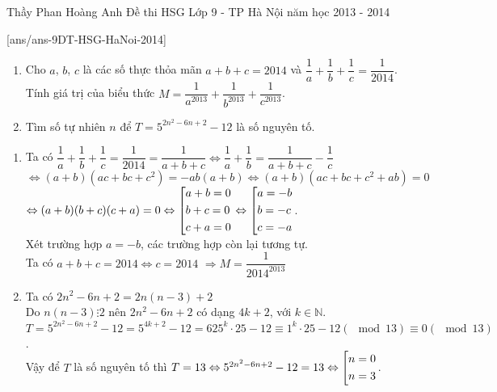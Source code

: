 \begin{name}
{Thầy  Phan Hoàng Anh}
{Đề thi HSG Lớp 9 -  TP Hà Nội năm học 2013 - 2014}
\end{name}
\setcounter{ex}{0}
[ans/ans-9DT-HSG-HaNoi-2014]
\begin{ex}%
    \hfill
    \begin{enumerate}
        \item Cho $a$, $b$, $c$ là các số thực thỏa mãn $a+b+c=2014$ và $\dfrac{1}{a}+\dfrac{1}{b}+\dfrac{1}{c}=\dfrac{1}{2014}$. Tính giá trị của biểu thức $M=\dfrac{1}{a^{2013}}+\dfrac{1}{b^{2013}}+\dfrac{1}{c^{2013}}$.
        \item Tìm số tự nhiên $n$ để $T=5^{2n^2-6n+2}-12$ là số nguyên tố.
    \end{enumerate}
\loigiai
    {\begin{enumerate}
        \item Ta có $\dfrac{1}{a}+\dfrac{1}{b}+\dfrac{1}{c}=\dfrac{1}{2014}=\dfrac{1}{a+b+c}\Leftrightarrow\dfrac{1}{a}+\dfrac{1}{b}=\dfrac{1}{a+b+c}-\dfrac{1}{c}$\\
        $\Leftrightarrow(a+b)(ac+bc+c^2)=-ab(a+b)\Leftrightarrow(a+b)(ac+bc+c^2+ab)=0$\\
        $\Leftrightarrow(a+b)(b+c)(c+a)=0\Leftrightarrow\left[\begin{aligned}&a+b=0\\&b+c=0\\&c+a=0\end{aligned}\right.\Leftrightarrow\left[\begin{aligned}&a=-b\\&b=-c\\&c=-a\end{aligned}\right.$.\\
        Xét trường hợp $a=-b$, các trường hợp còn lại tương tự.\\
        Ta có $a+b+c=2014\Leftrightarrow c=2014$ $\Rightarrow M=\dfrac{1}{2014^{2013}}$
        \item Ta có $2n^2-6n+2=2n(n-3)+2$\\
        Do $n(n-3)\vdots2$ nên $2n^2-6n+2$ có dạng $4k+2$, với $k\in\mathbb{N}$.\\
        $T=5^{2n^2-6n+2}-12=5^{4k+2}-12=625^k\cdot25-12\equiv1^k\cdot25-12(\mod13)\equiv0(\mod13)$.\\
        Vậy để $T$ là số nguyên tố thì $T=13\Leftrightarrow5^{2n^2-6n+2}-12=13\Leftrightarrow\left[\begin{aligned}&n=0\\&n=3\end{aligned}\right.$.
    \end{enumerate}
    }
\end{ex}

